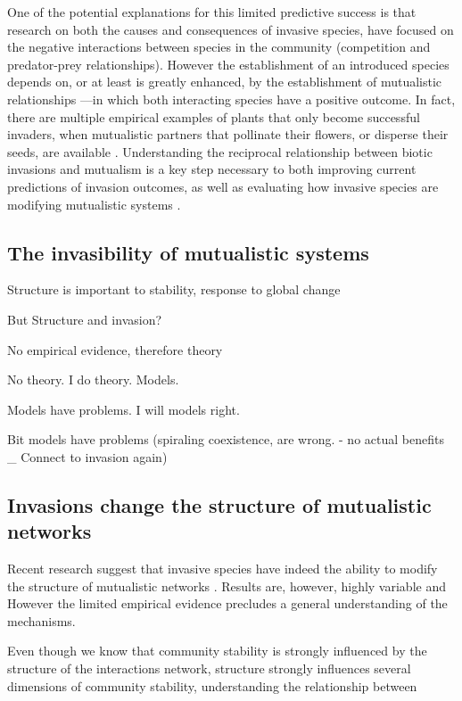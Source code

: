 \documentclass[a4paper]{article}
\begin{document}
One of the potential explanations for this limited predictive success is that research on both the causes and consequences of invasive species, have focused on the negative interactions between species in the community (competition and predator-prey relationships).
However the establishment of an introduced species depends on, or at least is greatly enhanced, by the establishment of  mutualistic relationships \citep{Richardson2000}---in which both interacting species have a positive outcome.
In fact, there are multiple empirical examples of plants that only become successful invaders, when mutualistic partners that pollinate their flowers, or disperse their seeds, are available \citep{Simberloff1999, Simberloff2006, Prior2014}.
Understanding the reciprocal relationship between biotic invasions and mutualism is a key step necessary to both improving current predictions of invasion outcomes, as well as evaluating how invasive species are modifying mutualistic systems \citep{Richardson2000}. 

\subsection*{The invasibility of mutualistic systems}

Structure is important to stability, response to global change

But Structure and invasion?

No empirical evidence, therefore theory

No theory. I do theory. Models.

Models have problems. I will models right.

Bit models have problems (spiraling coexistence, are wrong. - no actual benefits _ Connect to invasion again)


\subsection*{Invasions change the structure of mutualistic networks}

Recent research suggest that invasive species have indeed the ability to modify the structure of mutualistic networks \citep{Olesen2002, Aizen2008, Bartomeus2008, Vila2009}.
Results are, however, highly variable and
However the limited empirical evidence precludes a general understanding of the mechanisms.

Even though we know that community stability is strongly influenced by the structure of the interactions network,  structure strongly influences several dimensions of community stability, understanding the relationship between
\end{document}
